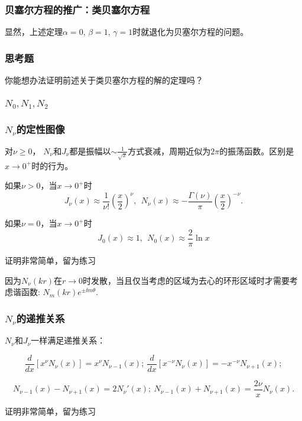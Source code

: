 \documentclass[CJK]{beamer}
\begin{document}
\begin{frame}
  \frametitle{贝塞尔方程的推广：类贝塞尔方程}

  显然，上述定理$\alpha=0$, $\beta = 1$, $\gamma=1$时就退化为贝塞尔方程的问题。
\end{frame}


\begin{frame}
  \frametitle{思考题}
  
  你能想办法证明前述关于类贝塞尔方程的解的定理吗？
\end{frame}


\begin{frame}
\frametitle{$N_0, N_1, N_2$}


\end{frame}


\begin{frame}
\frametitle{$N_\nu$的定性图像}

对$\nu\ge 0$， $N_\nu$和$J_\nu$都是振幅以$\sim \frac{1}{\sqrt{x}}$方式衰减，周期近似为$2\pi$的振荡函数。区别是$x\rightarrow 0^+$时的行为。

如果$\nu>0$，当$x\rightarrow 0^+$时
$$J_\nu(x)\approx \frac{1}{\nu !}\left(\frac{x}{2}\right)^\nu,\ \ N_\nu(x) \approx -\frac{\Gamma(\nu)}{\pi}\left(\frac{x}{2}\right)^{-\nu}. $$

\skiplines

如果$\nu = 0$，当$x\rightarrow 0^+$时
$$J_0(x)\approx 1 , \ \ N_0(x) \approx \frac{2}{\pi}\ln x $$

证明非常简单，留为练习

{\blue 因为$N_\nu(kr)$在$r\rightarrow 0$时发散，当且仅当考虑的区域为去心的环形区域时才需要考虑谐函数: $N_m(kr)e^{\pm \ii m\theta}$.}

\end{frame}

\begin{frame}
\frametitle{$N_\nu$的递推关系}

$N_\nu$和$J_\nu$一样满足递推关系：
{\blue
  $$ \frac{d}{dx}\left[x^\nu N_\nu(x)\right] = x^\nu N_{\nu -1}(x);\ \frac{d}{dx}\left[x^{-\nu} N_\nu(x)\right] = -x^{-\nu} N_{\nu +1}(x);  $$

  $$ N_{\nu-1}(x)-N_{\nu+1}(x) =2N_\nu'(x) ;\  N_{\nu-1}(x)+N_{\nu+1}(x) = \frac{2\nu}{x}N_\nu(x).$$}

证明非常简单，留为练习

\end{frame}
\end{document}
